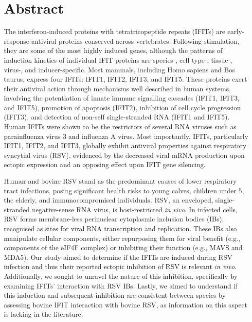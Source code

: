 \chapter{Abstract}
The interferon-induced proteins with tetratricopeptide repeats (IFITs) are early-response antiviral proteins conserved across vertebrates. Following stimulation, they are some of the most highly induced genes, although the patterns of induction kinetics of individual IFIT proteins are species-, cell type-, tissue-, virus-, and inducer-specific. Most mammals, including Homo sapiens and Bos taurus, express four IFITs: IFIT1, IFIT2, IFIT3, and IFIT5. These proteins exert their antiviral action through mechanisms well described in human systems, involving the potentiation of innate immune signalling cascades (IFIT1, IFIT3, and IFIT5), promotion of apoptosis (IFIT2), inhibition of cell cycle progression (IFIT3), and detection of non-self single-stranded RNA (IFIT1 and IFIT5). Human IFITs were shown to be the restrictors of several RNA viruses such as parainfluenza virus 3 and influenza A virus. Most importantly, IFITs, particularly IFIT1, IFIT2, and IFIT3, globally exhibit antiviral properties against respiratory syncytial virus (RSV), evidenced by the decreased viral mRNA production upon ectopic expression and an opposing effect upon IFIT gene silencing.

Human and bovine RSV stand as the predominant causes of lower respiratory tract infections, posing significant health risks to young calves, children under 5, the elderly, and immunocompromised individuals. RSV, an enveloped, single-stranded negative-sense RNA virus, is host-restricted \textit{in vivo}. In infected cells, RSV forms membrane-less perinuclear cytoplasmic inclusion bodies (IBs), recognised as sites for viral RNA transcription and replication. These IBs also manipulate cellular components, either repurposing them for viral benefit (e.g., components of the eIF4F complex) or inhibiting their function (e.g., MAVS and MDA5). Our study aimed to determine if the IFITs are induced during RSV infection and thus their reported ectopic inhibition of RSV is relevant \textit{in vivo}. Additionally, we sought to unravel the nature of this inhibition, specifically by examining IFITs' interaction with RSV IBs. Lastly, we aimed to understand if this induction and subsequent inhibition are consistent between species by assessing bovine IFIT interaction with bovine RSV, as information on this aspect is lacking in the literature.

